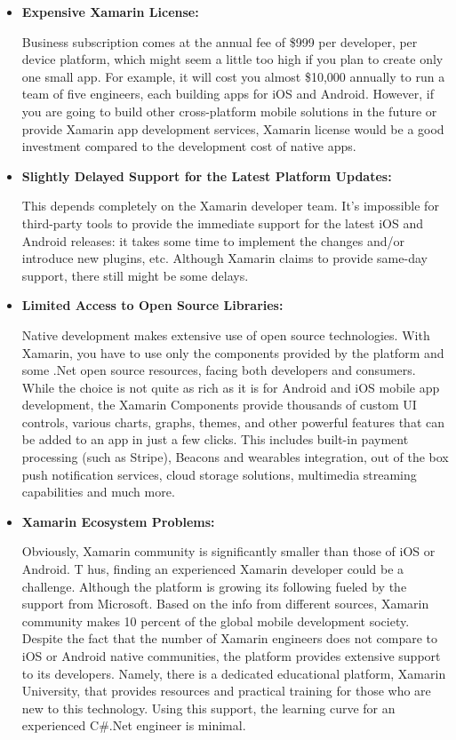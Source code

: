 \begin{itemize}


 \item \textbf{Expensive Xamarin License:}

 Business subscription comes at the annual fee of \$999 per developer, per device platform, which might seem a little too high if you plan to create only one small app.
 For example, it will cost you almost \$10,000 annually to run a team of five engineers, each building apps for iOS and Android.
 However, if you are going to build other cross-platform mobile solutions in the future or provide Xamarin app development services,
 Xamarin license would be a good investment compared to the development cost of native apps.



 \item \textbf{ Slightly Delayed Support for the Latest Platform Updates:}

 This depends completely on the Xamarin developer team. It’s impossible for third-party tools to provide the immediate support for the latest iOS and Android releases: it takes some time to implement the changes and/or introduce new plugins, etc.
 Although Xamarin claims to provide same-day support, there still might be some delays.


 \item \textbf{Limited Access to Open Source Libraries:}

 Native development makes extensive use of open source technologies.
 With Xamarin, you have to use only the components provided by the platform and some .Net open source resources, facing both developers and consumers. While the choice is not quite as rich as it is for Android and iOS mobile app development, the Xamarin Components provide thousands of custom UI controls, various charts, graphs, themes, and other powerful features that can be added to an app in just a few clicks.
 This includes built-in payment processing (such as Stripe), Beacons and wearables integration, out of the box push notification services, cloud storage solutions, multimedia streaming capabilities and much more.

 \item \textbf{ Xamarin Ecosystem Problems: }

 Obviously, Xamarin community is significantly smaller than those of iOS or Android. T
 hus, finding an experienced Xamarin developer could be a challenge. Although the platform is growing its following fueled by the support from Microsoft. Based on the info from different sources, Xamarin community makes 10 percent of the global mobile development society.
 Despite the fact that the number of Xamarin engineers does not compare to iOS or Android native communities, the platform provides extensive support to its developers.
 Namely, there is a dedicated educational platform, Xamarin University, that provides resources and practical training for those who are new to this technology. Using this support, the learning curve for an experienced C\#.Net engineer is minimal.

\end{itemize}





